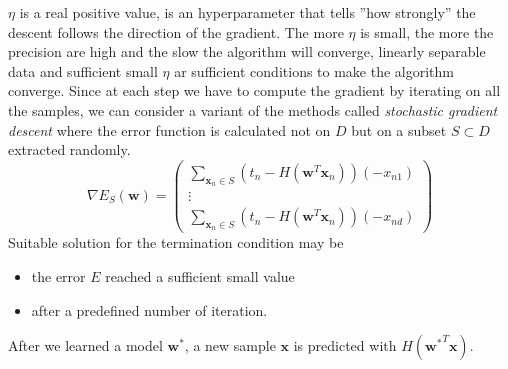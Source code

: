 \documentclass[10pt, letterpaper]{report}
\begin{document}
$\eta$ is a real positive value, is an hyperparameter that tells ''how strongly'' the descent follows the direction of the gradient. The more $\eta$ is small, the more the precision are high and the slow the algorithm will converge, linearly separable data and sufficient small $\eta$ ar sufficient conditions to make the algorithm converge. Since at each step we have to compute the gradient by iterating on all the samples, we can consider a variant of the methods called \textit{stochastic gradient descent} where the error function is calculated not on $D$ but on a subset $S\subset D$ extracted randomly.\begin{equation}
	\nabla E_S(\mathbf w)=\begin{pmatrix}
		\sum_{\mathbf x_n\in S}(t_n-H(\mathbf w^T\mathbf x_n))(- x_{n1}) \\
		\vdots                                                           \\
		\sum_{\mathbf x_n\in S}(t_n-H(\mathbf w^T\mathbf x_n))(- x_{nd})
	\end{pmatrix}
\end{equation}
Suitable solution for the termination condition may be\begin{itemize}
	\item the error $E$ reached a sufficient small value
	\item after a predefined number of iteration.
\end{itemize}
After we learned a model $\mathbf w^*$, a new sample $\mathbf x$ is predicted with $H({\mathbf  w^*}^T\mathbf x)$.
%
\cite{} %
%
%
\end{document}
